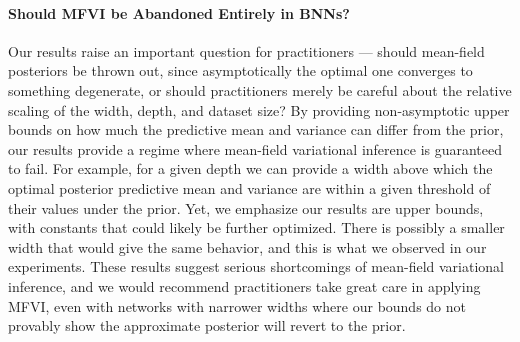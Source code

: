 \documentclass[twoside]{article}
\theoremstyle{theoremstyle}
\begin{document}
\paragraph{Should MFVI be Abandoned Entirely in BNNs?}
Our results raise an important question for practitioners --- should mean-field posteriors be thrown out, since asymptotically the optimal one converges to something degenerate, or should practitioners merely be careful about the relative scaling of the width, depth, and dataset size? By providing non-asymptotic upper bounds on how much the predictive mean and variance can differ from the prior, our results provide a regime where mean-field variational inference is guaranteed to fail. For example, for a given depth we can provide a width above which the optimal posterior predictive mean and variance are within a given threshold of their values under the prior. Yet, we emphasize our results are upper bounds, with constants that could likely be further optimized. There is possibly a smaller width that would give the same behavior, and this is what we observed in our experiments. These results suggest serious shortcomings of mean-field variational inference, and we would recommend practitioners take great care in applying MFVI, even with networks with narrower widths where our bounds do not provably show the approximate posterior will revert to the prior. 
\end{document}
